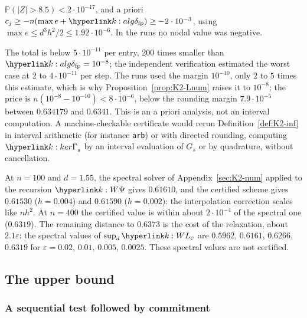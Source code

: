 \documentclass[11pt]{article}
\renewcommand{\P}{\mathbb{P}}
\newcommand{\1}{\mathbf{1}}
\begin{document}
\begin{remark}
\begin{itemize}
$\P(|Z|>8.5)<2\cdot10^{-17}$, and a priori $c_j\ge-n(\max e+\kdfp)\ge-2\cdot10^{-3}$, using $\max e\le d^3h^2/2\le1.92\cdot10^{-6}$. In the runs no nodal value was negative.
\end{itemize}
The total is below $5\cdot10^{-11}$ per entry, $200$ times smaller than $\kdfp=10^{-8}$; the independent verification estimated the worst case at $2$ to $4\cdot10^{-11}$ per
step. The runs used the margin $10^{-10}$, only $2$ to $5$ times this estimate, which is why Proposition~\ref{prop:K2-Lnum} raises it to $10^{-8}$; the price is
$n(10^{-8}-10^{-10})<8\cdot10^{-6}$, below the rounding margin $7.9\cdot10^{-5}$ between $0.634179$ and $0.6341$. This is an a priori analysis, not an interval
computation. A machine-checkable certificate would rerun Definition~\ref{def:K2-inf} in interval arithmetic (for instance \texttt{arb}) or with directed rounding,
computing $\kGam_s$ by an interval evaluation of $G_s$ or by quadrature, without cancellation.
\end{remark}

\begin{remark}\label{rem:K2-size}
At $n=100$ and $d=1.55$, the spectral solver of Appendix~\ref{sec:K2-num} applied to the recursion $\kW$ gives $0.61610$, and the certified scheme gives $0.61530$ ($h=0.004$)
and $0.61590$ ($h=0.002$): the interpolation correction scales like $nh^2$. At $n=400$ the certified value is within about $2\cdot10^{-4}$ of the spectral one
($0.6319$). The remaining distance to $0.6373$ is the cost of the relaxation, about $2.1\varepsilon$: the spectral values of $\sup_d\kL$ are $0.5962$, $0.6161$, $0.6266$,
$0.6319$ for $\varepsilon=0.02$, $0.01$, $0.005$, $0.0025$. These spectral values are not certified.
\end{remark}

\subsection{The upper bound}\label{sec:K2-upper}

\subsubsection{A sequential test followed by commitment}
\end{document}
